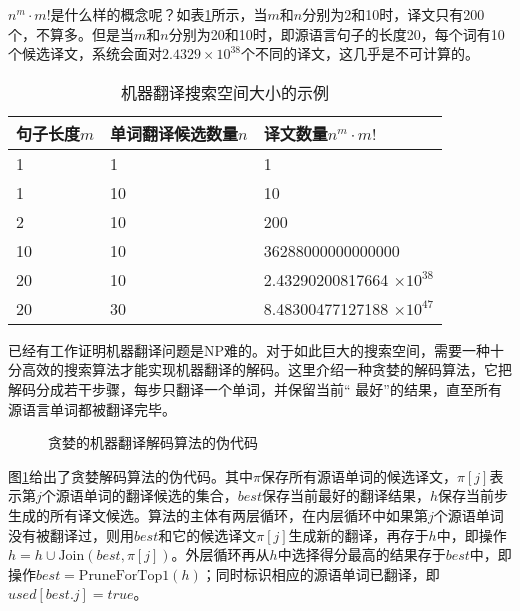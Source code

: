 \parinterval $n^{m}\cdot m!$是什么样的概念呢？如表\ref{tab:3-2}所示，当$m$和$n$分别为2和10时，译文只有200个，不算多。但是当$m$和$n$分别为20和10时，即源语言句子的长度20，每个词有10个候选译文，系统会面对$2.4329 \times 10^{38}$个不同的译文，这几乎是不可计算的。

\begin{table}[htp]{
\begin{center}
\caption{机器翻译搜索空间大小的示例}
\label{tab:3-2}
\begin{tabular}{l | l | l}
句子长度$m$ & 单词翻译候选数量$n$ & 译文数量$n^m \cdot m!$ \\ \hline
1 & 1 & 1 \\
1 & 10 & 10 \\
2 & 10 & 200 \\
10 & 10 & 36288000000000000 \\
20 & 10 & 2.43290200817664 $\times 10^{38}$ \\
20 & 30 & 8.48300477127188 $\times 10^{47}$
\end{tabular}
\end{center}
}\end{table}

\parinterval 已经有工作证明机器翻译问题是NP难的\cite{knight1999decoding}。对于如此巨大的搜索空间，需要一种十分高效的搜索算法才能实现机器翻译的解码。这里介绍一种贪婪的解码算法，它把解码分成若干步骤，每步只翻译一个单词，并保留当前`` 最好''的结果，直至所有源语言单词都被翻译完毕。
\vspace{0.3em}
\begin{figure}[htp]
    \centering

    \caption{贪婪的机器翻译解码算法的伪代码}
    \label{fig:3-10}
\end{figure}
\vspace{-0.0em}

\parinterval 图\ref{fig:3-10}给出了贪婪解码算法的伪代码。其中$\pi$保存所有源语单词的候选译文，$\pi[j]$表示第$j$个源语单词的翻译候选的集合，$best$保存当前最好的翻译结果，$h$保存当前步生成的所有译文候选。算法的主体有两层循环，在内层循环中如果第$j$个源语单词没有被翻译过，则用$best$和它的候选译文$\pi[j]$生成新的翻译，再存于$h$中，即操作$h=h\cup{\textrm{Join}(best,\pi[j])}$。外层循环再从$h$中选择得分最高的结果存于$best$中，即操作$best=\textrm{PruneForTop1}(h)$；同时标识相应的源语单词已翻译，即$used[best.j]=true$。

